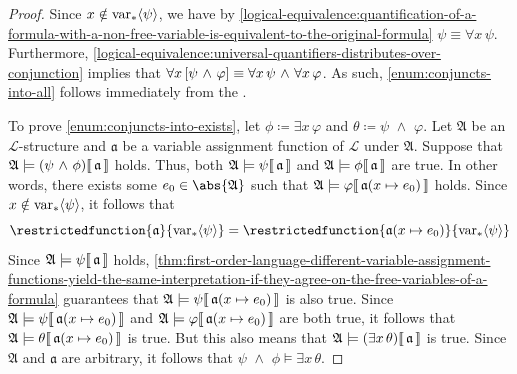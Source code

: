 \begin{proof}
    Since \( x \notin \operatorname{var}_{\ast} \langle\psi\rangle \), we have by \cref{logical-equivalence:quantification-of-a-formula-with-a-non-free-variable-is-equivalent-to-the-original-formula}
    \(  \psi \equiv \forall x \, \psi  \). Furthermore, \cref{logical-equivalence:universal-quantifiers-distributes-over-conjunction} implies that
    \( \forall x \, \mleft[ \psi \,\,{\land}\,\, \varphi \mright] \equiv \forall x \, \psi \,\,{\land}\,\, \forall x \, \varphi \).
    As such, \ref{enum:conjuncts-into-all} follows immediately from the .

    \vspace{0.3cm}
    \noindent
    To prove \ref{enum:conjuncts-into-exists}, let \( \phi \coloneq \exists x \, \varphi \) and \( \theta \coloneq \psi \,\,{\land}\,\, \varphi \).
    Let \( \mathfrak{A} \) be an \( \mathcal{L} \)-structure and \( \mathfrak{a} \) be a variable assignment function of \( \mathcal{L} \) under \( \mathfrak{A} \).
    Suppose that \( \folwffsatisfaction{\mathfrak{A}}{\mleft( \psi \,\,{\land}\,\, \phi \mright)}{\mathfrak{a}} \) holds.
    Thus, both \(  \mathfrak{A} \models \psi\llbracket\, \mathfrak{a} \,\rrbracket \) and \(  \mathfrak{A} \models \phi\llbracket\, \mathfrak{a} \,\rrbracket \) are true.
    In other words, there exists some \( e_{0} \in \abs{\mathfrak{A}} \) such that
    \( \folwffsatisfaction{\mathfrak{A}}{\varphi}{ \folmodifiedvariableassignmentfunction{\mathfrak{a}}{x}{e_{0}} } \) holds.
    Since \( x \notin \operatorname{var}_{\ast} \langle\psi\rangle \), it follows that
    \begin{equation*}
        \restrictedfunction{\mathfrak{a}}{\folfreevars{\psi}} =
        \restrictedfunction{ \folmodifiedvariableassignmentfunction{\mathfrak{a}}{x}{e_{0}} }{\folfreevars{\psi}}
    \end{equation*}
    Since \(  \mathfrak{A} \models \psi\llbracket\, \mathfrak{a} \,\rrbracket \) holds,
    \cref{thm:first-order-language-different-variable-assignment-functions-yield-the-same-interpretation-if-they-agree-on-the-free-variables-of-a-formula} guarantees that
    \( \folwffsatisfaction{\mathfrak{A}}{\psi}{ \folmodifiedvariableassignmentfunction{\mathfrak{a}}{x}{e_{0}} } \) is also true.
    Since \( \folwffsatisfaction{\mathfrak{A}}{\psi}{ \folmodifiedvariableassignmentfunction{\mathfrak{a}}{x}{e_{0}} } \) and 
    \( \folwffsatisfaction{\mathfrak{A}}{\varphi}{ \folmodifiedvariableassignmentfunction{\mathfrak{a}}{x}{e_{0}} } \) are both true,
    it follows that \( \folwffsatisfaction{\mathfrak{A}}{\theta}{ \folmodifiedvariableassignmentfunction{\mathfrak{a}}{x}{e_{0}} } \) is true.
    But this also means that \( \folwffsatisfaction{\mathfrak{A}}{\mleft( \exists x \, \theta \mright)}{\mathfrak{a}} \) is true.
    Since \( \mathfrak{A} \) and \( \mathfrak{a} \) are arbitrary, it follows that \( \psi \,\,{\land}\,\, \phi \models \exists x \, \theta \).


\end{proof}
